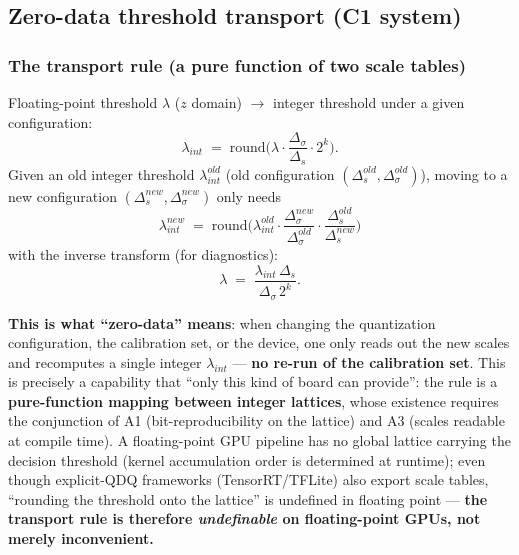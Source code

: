 \subsection{Zero-data threshold transport (C1 system)}
\label{sec:transport}

\subsubsection{The transport rule (a pure function of two scale tables)}
\label{sec:transport-rule}

Floating-point threshold $\lambda$ ($z$ domain) $\to$ integer threshold under a given configuration:
\begin{equation}
\lambda_{int} \;=\; \mathrm{round}\!\Big(\lambda\cdot\frac{\Delta_\sigma}{\Delta_s}\cdot 2^{k}\Big).
\tag{3.25}
\label{eq:transport-int}
\end{equation}
Given an old integer threshold $\lambda_{int}^{old}$ (old configuration $(\Delta_s^{old},\Delta_\sigma^{old})$), moving to a new configuration $(\Delta_s^{new},\Delta_\sigma^{new})$ only needs
\begin{equation}
\boxed{\;
\lambda_{int}^{new} \;=\; \mathrm{round}\!\Big(
\lambda_{int}^{old}\cdot
\frac{\Delta_\sigma^{new}}{\Delta_\sigma^{old}}\cdot
\frac{\Delta_s^{old}}{\Delta_s^{new}}\Big)\;}
\tag{3.26}
\label{eq:transport}
\end{equation}
with the inverse transform (for diagnostics):
\begin{equation}
\lambda \;=\; \frac{\lambda_{int}\,\Delta_s}{\Delta_\sigma\,2^{k}} .
\tag{3.27}
\label{eq:transport-inv}
\end{equation}

\textbf{This is what ``zero-data'' means}: when changing the quantization configuration, the calibration set, or the device, one only reads out the new scales and recomputes a single integer $\lambda_{int}$ --- \textbf{no re-run of the calibration set}.
This is precisely a capability that ``only this kind of board can provide'': the rule is a \textbf{pure-function mapping between integer lattices}, whose existence requires the conjunction of A1 (bit-reproducibility on the lattice) and A3 (scales readable at compile time).
A floating-point GPU pipeline has no global lattice carrying the decision threshold (kernel accumulation order is determined at runtime); even though explicit-QDQ frameworks (TensorRT/TFLite) also export scale tables, ``rounding the threshold onto the lattice'' is undefined in floating point --- \textbf{the transport rule is therefore \emph{undefinable} on floating-point GPUs, not merely inconvenient.}

